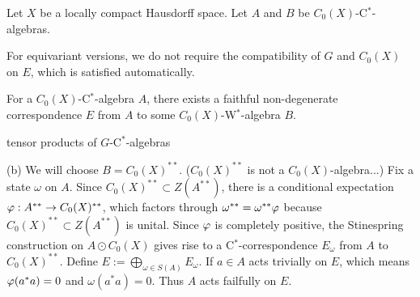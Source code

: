 \documentclass{../../large}
\begin{document}
\begin{prb}
Let $X$ be a locally compact Hausdorff space.
Let $A$ and $B$ be $C_0(X)$-C$^*$-algebras.

For equivariant versions, we do not require the compatibility of $G$ and $C_0(X)$ on $E$, which is satisfied automatically.
\begin{parts}
\item 
\item For a $C_0(X)$-C$^*$-algebra $A$, there exists a faithful non-degenerate correspondence $E$ from $A$ to some $C_0(X)$-W$^*$-algebra $B$.
\item tensor products of $G$-C$^*$-algebras
\end{parts}
\end{prb}
\begin{pf}


(b)
We will choose $B=C_0(X)^{**}$. ($C_0(X)^{**}$ is not a $C_0(X)$-algebra...)
Fix a state $\omega$ on $A$.
Since $C_0(X)^{**}\subset Z(A^{**})$, there is a conditional expectation $\varphi:A^{**}\to C_0(X)^{**}$, which factors through $\omega^{**}=\omega^{**}\varphi$ because $C_0(X)^{**}\subset Z(A^{**})$ is unital.
Since $\varphi$ is completely positive, the Stinespring construction on $A\odot C_0(X)$ gives rise to a C$^*$-correspondence $E_\omega$ from $A$ to $C_0(X)^{**}$.
Define $E:=\bigoplus_{\omega\in S(A)}E_\omega$.
If $a\in A$ acts trivially on $E$, which means $\varphi(a^*a)=0$ and $\omega(a^*a)=0$.
Thus $A$ acts failfully on $E$.

\end{pf}
\end{document}
